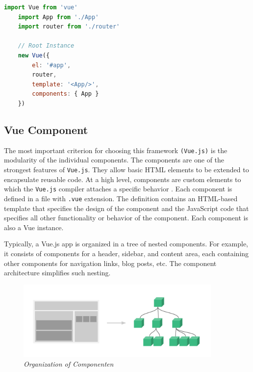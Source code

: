 \begin{lstlisting}[language=JavaScript, caption=main.js]
    import Vue from 'vue'
    import App from './App'
    import router from './router'

    // Root Instance
    new Vue({
        el: '#app',
        router,
        template: '<App/>',
        components: { App }
    })

\end{lstlisting}

\subsection{Vue Component}
\label{Vue:Component}
The most important criterion for choosing this framework \texttt{(Vue.js)} is the modularity of the individual components. The components are one of the strongest features of \texttt{Vue.js}. They allow basic HTML elements to be extended to encapsulate reusable code. At a high level, components are custom elements to which the \texttt{Vue.js} compiler attaches a specific behavior \cite{Vue019:Intro:Online}. Each component is defined in a file with \texttt{.vue} extension. The definition contains an HTML-based template that specifies the design of the component and the JavaScript code that specifies all other functionality or behavior of the component. Each component is also a Vue instance.

Typically, a Vue.js app is organized in a tree of nested components. For example, it consists of components for a header, sidebar, and content area, each containing other components for navigation links, blog posts, etc. The component architecture simplifies such nesting.

\begin{figure}[H]
  \centering
  \includegraphics[width=0.9\textwidth]{Bilder/img/components.png}  
  \caption{ \textit{Organization of Componenten} \cite{VueComponents:Online}}%
\label{fig:OrganisationvonKomponenten}
\end{figure}


